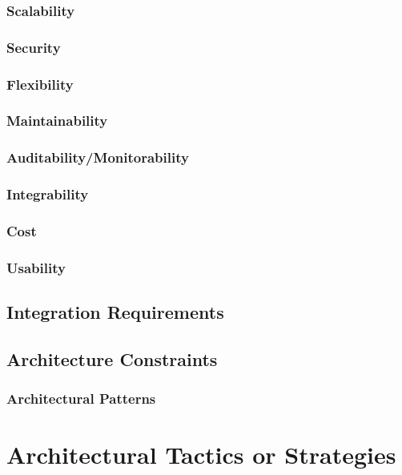 \documentclass[11pt,fleqn]{book} %
\begin{document}
		\subsection{Scalability}
		\subsection{Security}
		\subsection{Flexibility}
		\subsection{Maintainability}
		\subsection{Auditability/Monitorability}
		\subsection{Integrability}
		\subsection{Cost}
		\subsection{Usability}
		
	\section{Integration Requirements}
	
	\section{Architecture Constraints}
		\subsection{Architectural Patterns}



\chapter{Architectural Tactics or Strategies}
\end{document}
